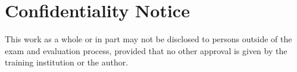 \chapter*{Confidentiality Notice}
This work as a whole or in part may
not be disclosed to persons outside of the exam and evaluation process,
provided that no other approval is given by the training institution or the author.
\cleardoublepage

